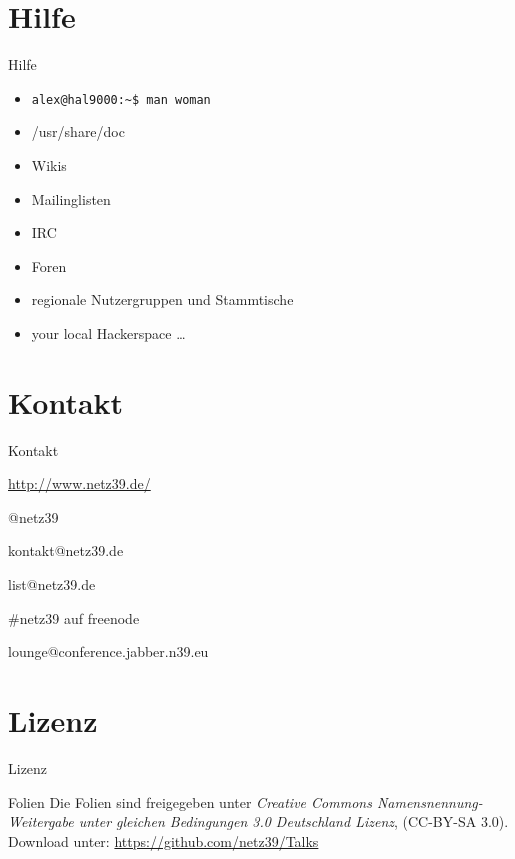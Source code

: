 \documentclass{beamer}
\begin{document}
\section{Hilfe}
\begin{frame}{Hilfe}
    \begin{itemize}
        \item \texttt{alex@hal9000:\textasciitilde\$ man woman}
        \item /usr/share/doc
        \item Wikis
        \item Mailinglisten
        \item IRC
        \item Foren
        \item regionale Nutzergruppen und Stammtische
        \item your local Hackerspace …
    \end{itemize}
\end{frame}

\section{Kontakt}

\begin{frame}{Kontakt}
    \begin{center}
        \begin{description}
            \item[WWW] \url{http://www.netz39.de/}
            \item[Twitter] @netz39
            \item[E-Mail] kontakt@netz39.de
            \item[Mailingliste] list@netz39.de
            \item[IRC] \#netz39 auf freenode
            \item[XMPP MUC] lounge@conference.jabber.n39.eu
        \end{description}
    \end{center}
\end{frame}

\appendix

\section{Lizenz}

\begin{frame}{Lizenz}
    \begin{block}{Folien}
        Die Folien sind freigegeben unter \emph{Creative Commons
        Namensnennung-Weitergabe unter gleichen Bedingungen 3.0
        Deutschland Lizenz}, (CC-BY-SA 3.0). Download unter:
        \url{https://github.com/netz39/Talks}
    \end{block}
\end{frame}
\end{document}
